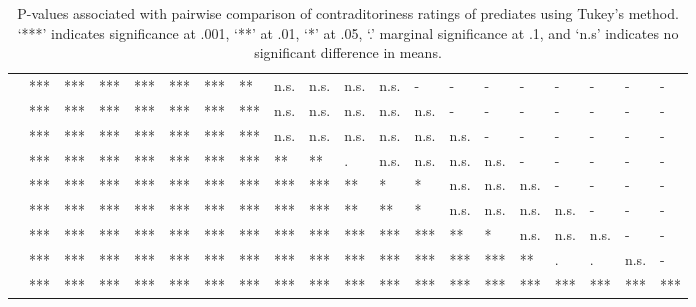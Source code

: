 \documentclass[11pt,fleqn]{article}
\newcommand{\6}{\mbox{$[\hspace*{-.6mm}[$}}
\newcommand{\9}{\mbox{$]\hspace*{-.6mm}]$}}
\begin{document}
\begin{landscape}
\begin{table}[h!]
\begin{tabular}{l l l l l l l l l l l l l l l l l l l l }
\color{green}{\em admit}\color{black}			& *** & *** & *** & *** & *** & *** & ** & n.s. & n.s. & n.s. & n.s. & - & - & - & - & - & - & - & - \\
\color{blue}{\em establish}\color{black}		& *** & *** & *** & *** & *** & *** & *** & n.s. & n.s. & n.s. & n.s. &  n.s. & - & - & - & - & - & - & - \\
\color{green}{\em demonstrate}\color{black}	& *** & *** & *** & *** & *** & *** & *** & n.s. & n.s. & n.s. & n.s. & n.s. & n.s. & - & - & - & - & - & - \\
\color{blue}{\em discover}\color{black}		& *** & *** & *** & *** & *** & *** & *** & ** & ** & . & n.s. & n.s. & n.s. & n.s. & - & - & - & - & - \\
\color{green}{\em confirm}\color{black}		& *** & *** & *** & *** & *** & *** & *** & *** & *** & ** & * & * & n.s. & n.s. & n.s. & - & - & - & - \\
\color{blue}{\em see}\color{black}			& *** & *** & *** & *** & *** & *** & *** & *** & *** & ** & ** & * & n.s. & n.s. & n.s. & n.s. & - & - & - \\
\color{blue}{\em know}\color{black}			& *** & *** & *** & *** & *** & *** & *** & *** & *** & *** & *** & *** & ** & * & n.s. & n.s. & n.s. & - & - \\
\color{green}{\em prove}\color{black}			& *** & *** & *** & *** & *** & *** & *** & *** & *** & *** & *** & *** & *** & *** & ** & . & . & n.s. & -  \\
\color{blue}{\em be right}\color{black}		& *** & *** & *** & *** & *** & *** & *** & *** & ***  & ***  & *** & *** & *** & *** & *** & *** & *** & *** & ***  \\

\bottomrule
\end{tabular}
\caption{P-values associated with pairwise comparison of contraditoriness ratings of prediates using Tukey's method. `***' indicates significance at .001, `**' at .01, `*' at .05, `.' marginal significance at .1, and `n.s' indicates no significant difference in means.}\label{t-pairwise}
\end{table}
\end{landscape}

\newpage
\end{document}

